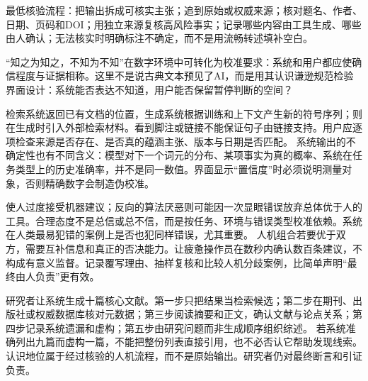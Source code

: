 \begin{argumentbox}
最低核验流程：把输出拆成可核实主张；追到原始或权威来源；核对题名、作者、日期、页码和DOI；用独立来源复核高风险事实；记录哪些内容由工具生成、哪些由人确认；无法核实时明确标注不确定，而不是用流畅转述填补空白。
\end{argumentbox}

\begin{comparison}
“知之为知之，不知为不知”在数字环境中可转化为校准要求\parencite[2.17]{analects2003}：系统和用户都应使确信程度与证据相称。这里不是说古典文本预见了AI，而是用其认识谦逊规范检验界面设计：系统能否表达不知道，用户能否保留暂停判断的空间？
\end{comparison}

检索系统返回已有文档的位置，生成系统根据训练和上下文产生新的符号序列；则在生成时引入外部检索材料。看到脚注或链接不能保证句子由链接支持。用户应逐项检查来源是否存在、是否真的蕴涵主张、版本与日期是否匹配。 系统输出的不确定性也有不同含义：模型对下一个词元的分布、某项事实为真的概率、系统在任务类型上的历史准确率，并不是同一数值。界面显示“置信度”时必须说明测量对象，否则精确数字会制造伪校准。

使人过度接受机器建议；反向的算法厌恶则可能因一次显眼错误放弃总体优于人的工具。合理态度不是总信或总不信，而是按任务、环境与错误类型校准依赖。系统在人类最易犯错的案例上是否也犯同样错误，尤其重要。 人机组合若要优于双方，需要互补信息和真正的否决能力。让疲惫操作员在数秒内确认数百条建议，不构成有意义监督。记录覆写理由、抽样复核和比较人机分歧案例，比简单声明“最终由人负责”更有效。

研究者让系统生成十篇核心文献。第一步只把结果当检索候选；第二步在期刊、出版社或权威数据库核对元数据；第三步阅读摘要和正文，确认文献与论点关系；第四步记录系统遗漏和虚构；第五步由研究问题而非生成顺序组织综述。 若系统准确列出九篇而虚构一篇，不能把整份列表直接引用，也不必否认它帮助发现线索。认识地位属于经过核验的人机流程，而不是原始输出。研究者仍对最终断言和引证负责。
